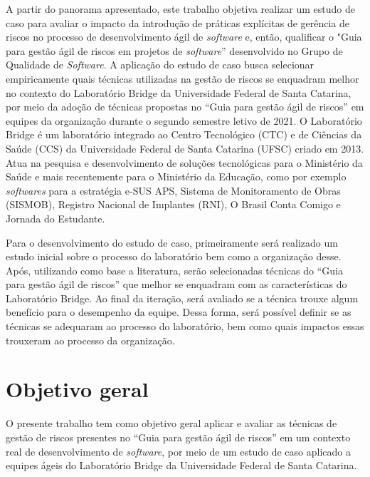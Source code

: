 \documentclass[
    12pt,       %
    openright,      %
    twoside,      %
    a4paper,      %
    english,      %
    french,       %
    spanish,      %
    brazil,       %
    ]{abntex2}
\begin{document}
A partir do panorama apresentado, este trabalho objetiva realizar um estudo de caso para avaliar o impacto da introdução de práticas explícitas de gerência de riscos no processo de desenvolvimento ágil de \textit{software} e, então, qualificar o "Guia para gestão ágil de riscos em projetos de \textit{software}” desenvolvido no Grupo de Qualidade de \textit{Software}. A aplicação do estudo de caso busca selecionar empiricamente quais técnicas utilizadas na gestão de riscos se enquadram melhor no contexto do Laboratório Bridge da Universidade Federal de Santa Catarina, por meio da adoção de técnicas propostas no “Guia para gestão ágil de riscos” \cite{Vieira:2020} em equipes da organização durante o segundo semestre letivo de 2021. O Laboratório Bridge é um laboratório integrado ao Centro Tecnológico (CTC) e de Ciências da Saúde (CCS) da Universidade Federal de Santa Catarina (UFSC) criado em 2013. Atua na pesquisa e desenvolvimento de soluções tecnológicas para o Ministério da Saúde e mais recentemente para o Ministério da Educação, como por exemplo \textit{softwares} para a estratégia e-SUS APS, Sistema de Monitoramento de Obras (SISMOB), Registro Nacional de Implantes (RNI), O Brasil Conta Comigo e Jornada do Estudante.

Para o desenvolvimento do estudo de caso, primeiramente será realizado um estudo inicial sobre o processo do laboratório bem como a organização desse. Após, utilizando como base a literatura, serão selecionadas técnicas do “Guia para gestão ágil de riscos” \cite{Vieira:2020} que melhor se enquadram com as características do Laboratório Bridge. Ao final da iteração, será avaliado se a técnica trouxe algum benefício para o desempenho da equipe. Dessa forma, será possível definir se as técnicas se adequaram ao processo do laboratório, bem como quais impactos essas trouxeram ao processo da organização.

\section{Objetivo geral}

O presente trabalho tem como objetivo geral aplicar e avaliar as técnicas de gestão de riscos presentes no “Guia para gestão ágil de riscos” \cite{Vieira:2020} em um contexto real de desenvolvimento de \textit{software}, por meio de um estudo de caso aplicado a equipes ágeis do Laboratório Bridge da Universidade Federal de Santa Catarina.
\end{document}
